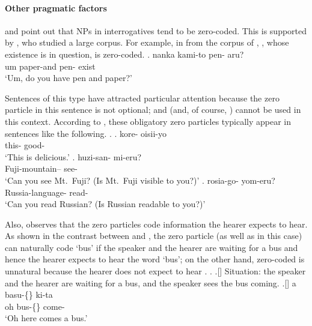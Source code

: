 




\paragraph{Other pragmatic factors}

 and  point out that
NPs in interrogatives tend to be zero-coded.
This is supported by ,
who studied a large corpus.
For example,
in \Next from the corpus of ,
, whose existence is in question, is zero-coded.
%
\exg. nanka kami-to pen-\EM{\O} aru? \\
      um paper-and pen-\ci{\O} exist \\
      `Um, do you have pen and paper?'
      \hfill{\cite[120]{fry01}}

Sentences of this type have attracted particular attention
because the zero particle in this sentence is not optional;
 and  (and, of course, ) cannot be used in this context.
According to ,
these obligatory zero particles typically appear in sentences like
the following.
%
\ex.
 \ag. kore-\EM{\O} oisii-yo \\
      this-\ci{\O} good- \\
      `This is delicious.'
 \bg. huzi-san-\EM{\O} mi-eru? \\
      Fuji-mountain--\ci{\O} see- \\
      `Can you see Mt.~Fuji? (Is Mt.~Fuji visible to you?)'
 \bg. rosia-go-\EM{\O} yom-eru? \\
      Russia-language-\ci{\O} read- \\
      `Can you read Russian? (Is Russian readable to you?)'
      \hfill{\cite[48]{onoe87}}


Also,  observes that
the zero particles code information the hearer expects to hear.
As shown in the contrast between \Next and \NNext,
the zero particle (as well as  in this case) can naturally code  `bus' \Next
if the speaker and the hearer are waiting for a bus and hence
the hearer expects to hear the word  `bus';
on the other hand,
zero-coded  \NNext is unnatural
because the hearer does not expect to hear .
%
\ex.
 \a.[] Situation: the speaker and the hearer are waiting for a bus,
       and the speaker sees the bus coming.
 \bg.[] a basu-\{\} ki-ta \\
      oh bus-\{\} come- \\
      `Oh here comes a bus.'
      \hfill{\cite[120]{tsutsui84}}

